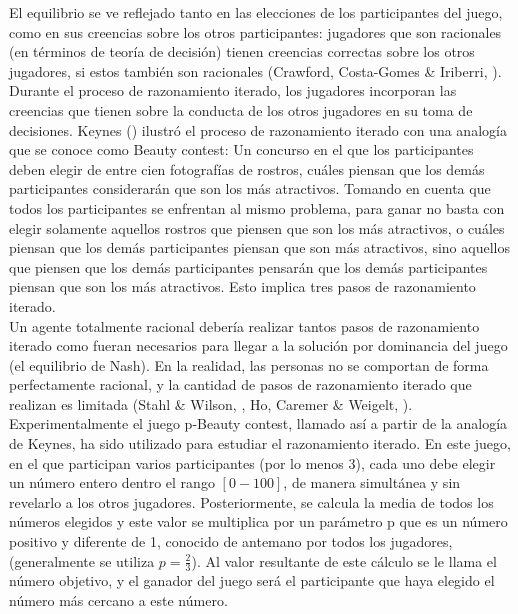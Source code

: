 El equilibrio se ve reflejado tanto en las elecciones de los participantes del juego, como en sus creencias sobre los otros participantes: jugadores que son racionales (en términos de teoría de decisión) tienen creencias correctas sobre los otros jugadores, si estos también son racionales (Crawford, Costa-Gomes & Iriberri, \citeyear{Crawford}).\\

Durante el proceso de razonamiento iterado, los jugadores incorporan las creencias que tienen sobre la conducta de los otros jugadores en su toma de decisiones. Keynes (\citeyear{Keynes}) ilustró el proceso de razonamiento iterado con una analogía que se conoce como Beauty contest: Un concurso en el que los participantes deben elegir de entre cien fotografías de rostros, cuáles piensan que los demás participantes considerarán que son los más atractivos. Tomando en cuenta que todos los participantes se enfrentan al mismo problema, para ganar no basta con elegir solamente aquellos rostros que piensen que son los más atractivos, o cuáles piensan que los demás participantes piensan que son más atractivos, sino aquellos que piensen que los demás participantes pensarán que los demás participantes piensan que son los más atractivos. Esto implica tres pasos de razonamiento iterado.\\

Un agente totalmente racional debería realizar tantos pasos de razonamiento iterado como fueran necesarios para llegar a la solución por dominancia del juego (el equilibrio de Nash). En la realidad, las personas no se comportan de forma perfectamente racional, y la cantidad de pasos de razonamiento iterado que realizan es limitada (Stahl & Wilson, \citeyear{Stahl}, Ho, Caremer & Weigelt, \citeyear{Ho}).\\

Experimentalmente el juego p-Beauty contest, llamado así a partir de la analogía de Keynes, ha sido utilizado para estudiar el razonamiento iterado. En este juego, en el que participan varios participantes (por lo menos 3), cada uno debe elegir un número entero dentro el rango $[0 - 100]$, de manera simultánea y sin revelarlo a los otros jugadores. Posteriormente, se calcula la media de todos los números elegidos y este valor se multiplica por un parámetro p que es un número positivo y diferente de 1, conocido de antemano por todos los jugadores, (generalmente se utiliza $p = \frac{2}{3}$). Al valor resultante de este cálculo se le llama el número objetivo, y el ganador del juego será el participante que haya elegido el número más cercano a este número.\\

